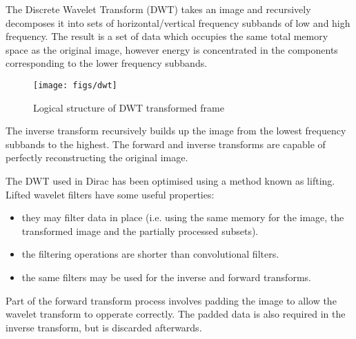 The Discrete Wavelet Transform (DWT) takes an image and recursively
decomposes it into sets of horizontal/vertical frequency subbands of low
and high frequency. The result is a set of data which occupies the same
total memory space as the original image, however energy is concentrated
in the components corresponding to the lower frequency subbands.

\begin{figure}
    \centering
    \texttt{[image: figs/dwt]}
    \caption{Logical structure of DWT transformed frame}
    \label{fig:dwt}
\end{figure}

The inverse transform recursively builds up the image from the lowest
frequency subbands to the highest.  The forward and inverse transforms
are capable of perfectly reconstructing the original image.

The DWT used in Dirac has been optimised using a method known as
lifting.  Lifted wavelet filters have some useful properties:
\begin{itemize}
    \item they may filter data in place (i.e. using the same memory for
    the image, the transformed image and the partially processed
    subsets).

    \item the filtering operations are shorter than convolutional
        filters.

    \item the same filters may be used for the inverse and forward
        transforms.
\end{itemize}

Part of the forward transform process involves padding the image to
allow the wavelet transform to opperate correctly.  The padded data is
also required in the inverse transform, but is discarded afterwards.


